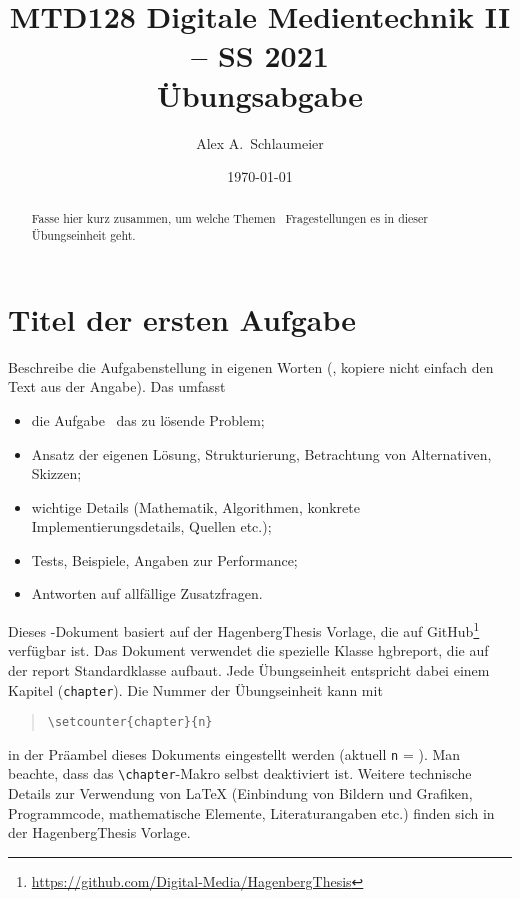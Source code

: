 \documentclass[german,notitlepage,smartquotes]{hgbreport}
\author{Alex A.\ Schlaumeier}                        %
\title{MTD128 Digitale Medientechnik II -- SS 2021\\ %
				Übungsabgabe \arabic{chapter}}
\date{\today}
\renewcommand{\chapter}[1]{} %
\begin{document}
\maketitle

\begin{abstract}\noindent
Fasse hier kurz zusammen, um welche Themen \bzw\ Fragestellungen es in dieser
Übungseinheit geht.
\end{abstract}


\section{Titel der ersten Aufgabe}

Beschreibe die Aufgabenstellung in eigenen Worten 
(\dah, kopiere nicht einfach den Text aus der Angabe).
Das umfasst \ia 
%
\begin{itemize}
	\item die Aufgabe \bzw\ das zu lösende Problem;
	\item Ansatz der eigenen Lösung, Strukturierung, Betrachtung von
	Alternativen, Skizzen;
	\item wichtige Details (Mathematik, Algorithmen, konkrete
	Implementierungsdetails, Quellen \cite{Sedgewick2011} %
	etc.);
	\item Tests, Beispiele, Angaben zur Performance;
	\item Antworten auf allfällige Zusatzfragen.
\end{itemize}

Dieses \latex-Dokument basiert auf der \textsf{HagenbergThesis} Vorlage, die auf
GitHub\footnote{\url{https://github.com/Digital-Media/HagenbergThesis}}
verfügbar ist.
Das Dokument verwendet die spezielle Klasse \textsf{hgbreport}, die auf der
\textsf{report} Standardklasse aufbaut. Jede Übungseinheit entspricht dabei
einem Kapitel (\texttt{chapter}). Die Nummer der Übungseinheit kann mit
%
\begin{quote}
\verb!\setcounter{chapter}{n}!
\end{quote}
%
in der Präambel dieses Dokuments eingestellt werden (aktuell \texttt{n} =
).
Man beachte, dass das \verb!\chapter!-Makro selbst deaktiviert ist.
Weitere technische Details zur Verwendung von LaTeX (Einbindung von Bildern und
Grafiken, Programmcode, mathematische Elemente, Literaturangaben etc.) finden
sich in der \textsf{HagenbergThesis} Vorlage.
\end{document}
